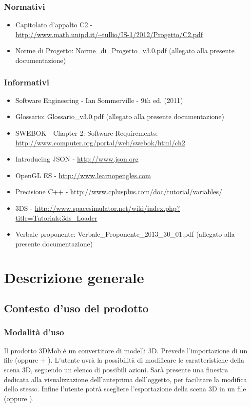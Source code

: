 \subsubsection{Normativi} %
\label{1.4.1}
\begin{itemize}
\item Capitolato d'appalto C2 - \Progetto{} \\
\url{http://www.math.unipd.it/~tullio/IS-1/2012/Progetto/C2.pdf}
\item Norme di Progetto: Norme\_{}di\_{}Progetto\_{}v3.0.pdf  (allegato alla presente documentazione)\\
\end{itemize}

\subsubsection{Informativi} %
\label{1.4.2}
\begin{itemize}
\item Software Engineering - Ian Sommerville - 9th ed. (2011)
\item Glossario: Glossario\_{}v3.0.pdf (allegato alla presente documentazione)
\item SWEBOK - Chapter 2: Software Requirements: \url{http://www.computer.org/portal/web/swebok/html/ch2}
\item Introducing JSON - \url{http://www.json.org}
\item OpenGL ES - \url{http://www.learnopengles.com}
\item Precisione C++ - \url{http://www.cplusplus.com/doc/tutorial/variables/}
\item 3DS - \url{http://www.spacesimulator.net/wiki/index.php?title=Tutorials:3ds_Loader}
\item Verbale proponente: Verbale\_{}Proponente\_{}2013\_{}30\_{}01.pdf (allegato alla presente documentazione)
\end{itemize}

\newpage


\section{Descrizione generale}%
\label{2.0}
\subsection{Contesto d'uso del prodotto} %
\label{2.1}
\subsubsection{Modalità d'uso} %
\label{2.1.1}
Il prodotto 3DMob è un convertitore di modelli 3D. Prevede l'importazione di un file \treds{} (oppure {}\obj + \mtl). L'utente avrà la possibilità di modificare le caratteristiche della scena 3D, seguendo un elenco di possibili azioni.	Sarà presente una finestra dedicata alla visualizzazione dell'anteprima dell'oggetto, per facilitare la modifica dello stesso. Infine l'utente potrà scegliere l'esportazione della scena 3D in un file \json{} (oppure \xml).
